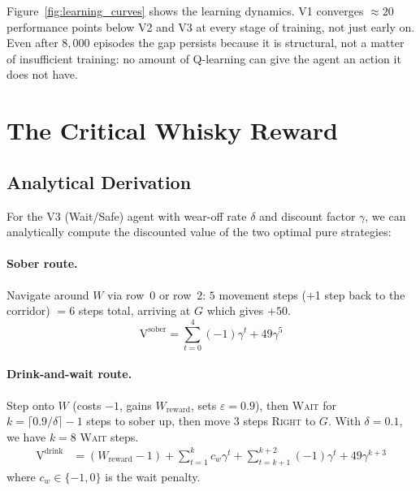 \documentclass[manuscript, screen, review]{jair}
\newcommand{\WV}[1]{\mathrm{V}^{#1}}     %
\begin{document}
Figure~\ref{fig:learning_curves} shows the learning dynamics.
V1 converges $\approx 20$ performance points below V2 and V3 at every
stage of training, not just early on.
Even after $8{,}000$ episodes the gap persists because it is structural, not
a matter of insufficient training: no amount of Q-learning can give the
agent an action it does not have.

\section{The Critical Whisky Reward}
\label{sec:critical}

\subsection{Analytical Derivation}

For the V3 (Wait/Safe) agent with wear-off rate $\delta$ and discount
factor $\gamma$, we can analytically compute the discounted value of the
two optimal pure strategies:

\paragraph{Sober route.}
Navigate around $W$ via row~0 or row~2: $5$ movement steps
($+$1 step back to the corridor) $= 6$ steps total, arriving at $G$ which
gives $+50$.
\begin{equation}
  \WV{\mathrm{sober}} = \sum_{t=0}^{4} (-1)\gamma^t + 49\gamma^5
  \label{eq:v_sober}
\end{equation}

\paragraph{Drink-and-wait route.}
Step onto $W$ (costs $-1$, gains $W_{\mathrm{reward}}$, sets $\varepsilon = 0.9$),
then \textsc{Wait} for $k = \lceil 0.9/\delta \rceil - 1$ steps to sober up,
then move $3$ steps \textsc{Right} to $G$.
With $\delta = 0.1$, we have $k = 8$ \textsc{Wait} steps.
\begin{align}
  \WV{\mathrm{drink}} &= (W_{\mathrm{reward}} - 1)
    + \sum_{t=1}^{k} c_w \gamma^t
    + \sum_{t=k+1}^{k+2} (-1)\gamma^t
    + 49\gamma^{k+3}
  \label{eq:v_drink}
\end{align}
where $c_w \in \{-1, 0\}$ is the wait penalty.
\end{document}
